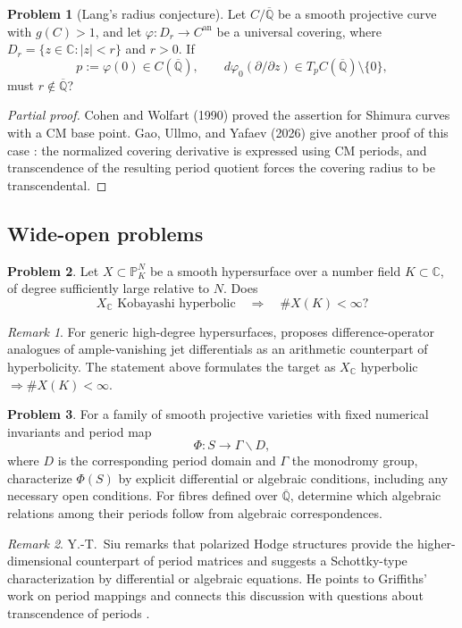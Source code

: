 \documentclass[11pt,reqno]{amsart}
\theoremstyle{definition}
\newtheorem{problem}{Problem}[section]
\theoremstyle{remark}
\newtheorem*{remark}{Remark}
\begin{document}
\begin{problem}[Lang's radius conjecture]\label{Siu-4.9}
Let $C/\overline{\mathbb Q}$ be a smooth projective curve with $g(C)>1$, and let $\varphi:D_r\to C^{\mathrm{an}}$ be a universal covering, where $D_r=\{z\in\mathbb C:|z|<r\}$ and $r>0$. If
\[
p:=\varphi(0)\in C(\overline{\mathbb Q}),\qquad
d\varphi_0(\partial/\partial z)\in T_pC(\overline{\mathbb Q})\setminus\{0\},
\]
must $r\notin\overline{\mathbb Q}$?
\end{problem}
\begin{proof}[Partial proof]
Cohen and Wolfart (1990) proved the assertion for Shimura curves with a CM base point. Gao, Ullmo, and Yafaev (2026) give another proof of this case \cite[\S8.1 and Proposition~8.1]{SIU-GUY26}: the normalized covering derivative is expressed using CM periods, and transcendence of the resulting period quotient forces the covering radius to be transcendental.
\end{proof}

\subsection{Wide-open problems}

\begin{problem}\label{Siu-3.2-arithmetic}
Let $X\subset\mathbb P^N_K$ be a smooth hypersurface over a number field $K\subset\mathbb C$, of degree sufficiently large relative to $N$. Does
\[
X_{\mathbb C}\text{ Kobayashi hyperbolic}\quad\Longrightarrow\quad \#X(K)<\infty?
\]
\end{problem}
\begin{remark}
For generic high-degree hypersurfaces, \cite[\S\S3.1--3.2]{Siu2025} proposes difference-operator analogues of ample-vanishing jet differentials as an arithmetic counterpart of hyperbolicity. The statement above formulates the target as $X_{\mathbb C}$ hyperbolic $\Rightarrow\#X(K)<\infty$.
\end{remark}

\begin{problem}\label{Siu-4.5}
For a family of smooth projective varieties with fixed numerical invariants and period map
\[
\Phi:S\longrightarrow\Gamma\backslash D,
\]
where $D$ is the corresponding period domain and $\Gamma$ the monodromy group, characterize $\Phi(S)$ by explicit differential or algebraic conditions, including any necessary open conditions. For fibres defined over $\overline{\mathbb Q}$, determine which algebraic relations among their periods follow from algebraic correspondences.
\end{problem}
\begin{remark}
Y.-T.~Siu remarks that polarized Hodge structures provide the higher-dimensional counterpart of period matrices and suggests a Schottky-type characterization by differential or algebraic equations. He points to Griffiths' work on period mappings and connects this discussion with questions about transcendence of periods \cite[\S\S4.5--4.6]{Siu2025}.
\end{remark}
\end{document}
